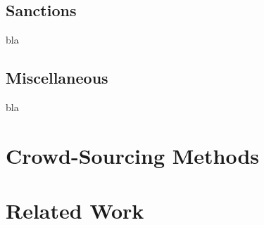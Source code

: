 \documentclass[a4paper,12pt]{report}
\begin{document}
	\section{Sanctions}
	\startsection
	bla
	\closesection

	\section{Miscellaneous}
	\startsection
	bla
	\closesection
	
	\chapter{Crowd-Sourcing Methods}
	\startsection
	\closesection
	
	\chapter{Related Work \cite{LanierWeylBlueprint}}
	\startsection
	\closesection


	\newpage
	\printbibliography
\end{document}
